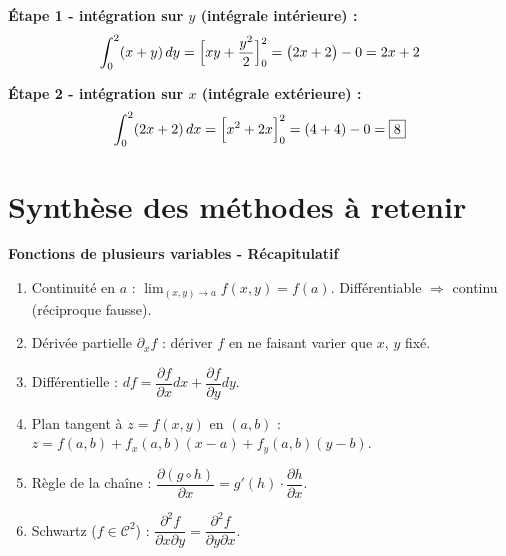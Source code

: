 \documentclass[11pt,a4paper]{article}
\begin{document}
\begin{reponsebox}
\textbf{Étape 1 - intégration sur $y$ (intégrale intérieure) :}
$$\int_0^2(x+y)\,dy = \Bigl[xy+\frac{y^2}{2}\Bigr]_0^2 = \bigl(2x + 2\bigr) - 0 = 2x + 2$$

\textbf{Étape 2 - intégration sur $x$ (intégrale extérieure) :}
$$\int_0^2(2x+2)\,dx = \Bigl[x^2+2x\Bigr]_0^2 = (4 + 4) - 0 = \boxed{8}$$
\end{reponsebox}

\newpage
\section*{\color{bleutexte}Synthèse des méthodes à retenir}

\begin{methodebox}
\textbf{Fonctions de plusieurs variables - Récapitulatif}
\begin{enumerate}[itemsep=2pt, topsep=2pt]
  \item Continuité en $a$ : $\lim_{(x,y)\to a}f(x,y) = f(a)$. Différentiable $\Rightarrow$ continu (réciproque fausse).
  \item Dérivée partielle $\partial_x f$ : dériver $f$ en ne faisant varier que $x$, $y$ fixé.
  \item Différentielle : $df = \dfrac{\partial f}{\partial x}dx + \dfrac{\partial f}{\partial y}dy$.
  \item Plan tangent à $z=f(x,y)$ en $(a,b)$ : $z = f(a,b) + f_x(a,b)(x-a) + f_y(a,b)(y-b)$.
  \item Règle de la chaîne : $\dfrac{\partial(g\circ h)}{\partial x} = g'(h)\cdot\dfrac{\partial h}{\partial x}$.
  \item Schwartz ($f\in\mathcal{C}^2$) : $\dfrac{\partial^2 f}{\partial x\partial y} = \dfrac{\partial^2 f}{\partial y\partial x}$.
\end{enumerate}
\end{methodebox}

\vspace{6pt}
\end{document}
